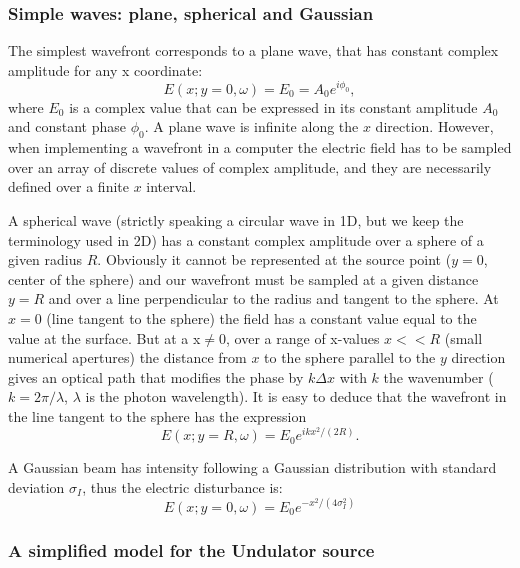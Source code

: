 \documentclass[]{spie}  %
\begin{document}
\subsubsection{Simple waves: plane, spherical and Gaussian}

The simplest wavefront corresponds to a plane wave, that has constant complex amplitude for any x coordinate: 
\begin{equation}
   E(x;y=0,\omega)=E_0=A_0 e^{i \phi_0},
\end{equation}
where $E_0$ is a complex value that can be expressed in its constant amplitude $A_0$ and constant phase $\phi_0$. A plane wave is infinite along the $x$ direction. However, when implementing a wavefront in a computer the electric field has to be sampled over an array of discrete values of complex amplitude, and they are necessarily defined over a finite $x$ interval. 

A spherical wave (strictly speaking a circular wave in 1D, but we keep the terminology used in 2D) has a constant complex amplitude over a sphere of a given radius $R$. Obviously it cannot be represented at the source point ($y=0$, center of the sphere) and our wavefront must be sampled at a given distance $y=R$ and over a line perpendicular to the radius and tangent to the sphere. At $x=0$ (line tangent to the sphere) the field has a constant value equal to the value at the surface. But at a x$\ne$0, over a range of x-values $x<<R$ (small numerical apertures) the distance from $x$ to the sphere parallel to the $y$ direction gives an optical path that modifies the phase by $k \Delta x$ with $k$ the wavenumber ($k = 2 \pi / \lambda$, $\lambda$ is the photon wavelength). It is easy to deduce that the wavefront in the line tangent to the sphere has the expression
\begin{equation}
\label{eq:sphericalWave}
    E(x;y=R,\omega)  = E_0 e^{i k x^2 / (2 R)}.
\end{equation}

A Gaussian beam has intensity following a Gaussian distribution with standard deviation $\sigma_I$, thus the electric disturbance is: 
\begin{equation}
    E(x;y=0,\omega) = E_0 e^{-x^2 / (4 \sigma_I^2)}
\end{equation}


\subsubsection{A simplified model for the Undulator source}
\label{sec:undulator}
\end{document}

